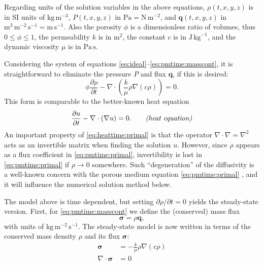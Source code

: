 \documentclass[11pt]{amsart}
\newcommand{\bq}{\mathbf{q}}
\newcommand{\bsigma}{\bm{\sigma}}
\newcommand{\Div}{\nabla\cdot}
\newcommand{\grad}{\nabla}
\begin{document}
\newcommand{\Patm}{P_{\text{atm}}}

Regarding units of the solution variables in the above equations, $\rho(t,x,y,z)$ is in SI units of $\text{kg}\,\text{m}^{-3}$, $P(t,x,y,z)$ in $\text{Pa} = \text{N}\,\text{m}^{-2}$, and $\bq(t,x,y,z)$ in $\text{m}^3\,\text{m}^{-2}\,\text{s}^{-1} = \text{m}\,\text{s}^{-1}$.  Also the porosity $\phi$ is a dimensionless ratio of volumes, thus $0\le \phi \le 1$, the permeability $k$ is in $\text{m}^2$, the constant $c$ is in $\text{J}\,\text{kg}^{-1}$, and the dynamic viscosity $\mu$ is in $\text{Pa}\,\text{s}$.

Considering the system of equations \eqref{eq:ideal}--\eqref{eq:pmtime:masscont}, it is straightforward to eliminate the pressure $P$ and flux $\bq$, if this is desired:
\begin{equation}
\phi \frac{\partial \rho}{\partial t} - \Div \left(\frac{k}{\mu} \rho \grad\left(c \rho\right)\right) = 0. \label{eq:pmtime:primal}
\end{equation}
This form is comparable to the better-known heat equation
\begin{equation}
\frac{\partial u}{\partial t} - \Div(\grad u) = 0. \qquad \text{\emph{(heat equation)}}\label{eq:heattime:primal}
\end{equation}
An important property of \eqref{eq:heattime:primal} is that the operator $\Div \grad = \grad^2$ acts as an invertible matrix when finding the solution $u$.  However, since $\rho$ appears as a flux coefficient in \eqref{eq:pmtime:primal}, invertibility is lost in \eqref{eq:pmtime:primal} if $\rho\to 0$ somewhere.  Such ``degeneration'' of the diffusivity is a well-known concern with the porous medium equation \eqref{eq:pmtime:primal} \citep[for example]{Vazquez2007}, and it will influence the numerical solution method below.

The model above is time dependent, but setting $\partial \rho/\partial t = 0$ yields the steady-state version.  First, for \eqref{eq:pmtime:masscont} we define the (conserved) mass flux
\begin{equation}
\bsigma = \rho \bq, \label{eq:massflux}
\end{equation}
with units of $\text{kg}\,\text{m}^{-2}\,\text{s}^{-1}$.  The steady-state model is now written in terms of the conserved mass density $\rho$ and its flux $\bsigma$:
\begin{subequations}
\label{eq:pm:strong}
\begin{align}
\bsigma &= - \frac{k}{\mu} \rho \grad\left(c \rho\right) \label{eq:darcy} \\
\Div \bsigma &= 0 \label{eq:masscont}
\end{align}
\end{subequations}
\end{document}

